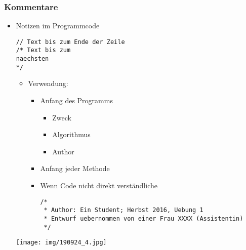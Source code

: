 \documentclass[11pt]{article}
\begin{document}
\subsubsection{Kommentare}
\label{sec:org586061e}
\begin{itemize}
\item Notizen im Programmcode\\
\begin{verbatim}
// Text bis zum Ende der Zeile
/* Text bis zum 
naechsten
*/
\end{verbatim}
\begin{itemize}
\item Verwendung:\\
\begin{itemize}
\item Anfang des Programms\\
\begin{itemize}
\item Zweck\\
\item Algorithmus\\
\item Author\\
\end{itemize}
\item Anfang jeder Methode\\
\item Wenn Code nicht direkt verständliche\\
\begin{verbatim}
/* 
 * Author: Ein Student; Herbst 2016, Uebung 1
 * Entwurf uebernommen von einer Frau XXXX (Assistentin) 
 */
\end{verbatim}
\end{itemize}
\end{itemize}
\begin{center}
\texttt{[image: img/190924\_4.jpg]}
\end{center}
\end{itemize}
\end{document}
